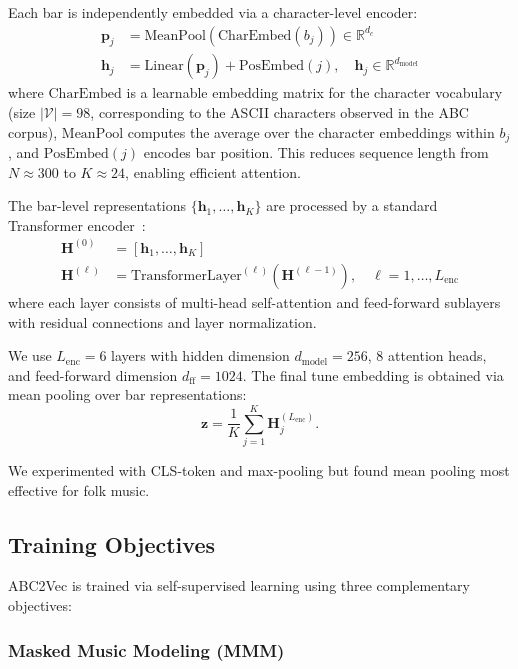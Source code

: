 \documentclass[]{interact}
\theoremstyle{plain}
\theoremstyle{definition}
\theoremstyle{remark}
\begin{document}
Each bar is independently embedded via a character-level encoder:
\begin{align}
\mathbf{p}_j &= \text{MeanPool}\left(\text{CharEmbed}(b_j)\right) \in \mathbb{R}^{d_c} \\
\mathbf{h}_j &= \text{Linear}(\mathbf{p}_j) + \text{PosEmbed}(j), \quad \mathbf{h}_j \in \mathbb{R}^{d_\text{model}}
\end{align}
where $\text{CharEmbed}$ is a learnable embedding matrix for the character vocabulary (size $|\mathcal{V}| = 98$, corresponding to the ASCII characters observed in the ABC corpus), $\text{MeanPool}$ computes the average over the character embeddings within $b_j$, and $\text{PosEmbed}(j)$ encodes bar position. This reduces sequence length from $N \approx 300$ to $K \approx 24$, enabling efficient attention.

The bar-level representations $\{\mathbf{h}_1, \ldots, \mathbf{h}_K\}$ are processed by a standard Transformer encoder~\cite{Transformer2017}:
\begin{align}
\mathbf{H}^{(0)} &= [\mathbf{h}_1, \ldots, \mathbf{h}_K] \\
\mathbf{H}^{(\ell)} &= \text{TransformerLayer}^{(\ell)}(\mathbf{H}^{(\ell-1)}), \quad \ell = 1, \ldots, L_\text{enc}
\end{align}
where each layer consists of multi-head self-attention and feed-forward sublayers with residual connections and layer normalization.

We use $L_\text{enc} = 6$ layers with hidden dimension $d_\text{model} = 256$, 8 attention heads, and feed-forward dimension $d_\text{ff} = 1024$. The final tune embedding is obtained via mean pooling over bar representations:
\begin{equation}
\mathbf{z} = \frac{1}{K} \sum_{j=1}^K \mathbf{H}^{(L_\text{enc})}_j.
\end{equation}

We experimented with CLS-token and max-pooling but found mean pooling most effective for folk music.

\subsection{Training Objectives}

ABC2Vec is trained via self-supervised learning using three complementary objectives:

\subsubsection{Masked Music Modeling (MMM)}
\end{document}
